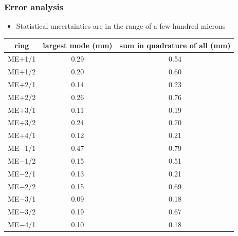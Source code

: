 \documentclass[compress]{beamer}
\begin{document}
\begin{frame}
\frametitle{Error analysis}

\begin{itemize}
\item Statistical uncertainties are in the range of a few hundred microns
\end{itemize}

\renewcommand{\arraystretch}{1.1}

\begin{center}\begin{tabular}{c c c}
\hline\hline
ring & largest mode (mm) & sum in quadrature of all (mm) \\\hline
ME$+$1/1 & 0.29 & 0.54 \\
ME$+$1/2 & 0.20 & 0.60 \\
ME$+$2/1 & 0.14 & 0.23 \\
ME$+$2/2 & 0.26 & 0.76 \\
ME$+$3/1 & 0.11 & 0.19 \\
ME$+$3/2 & 0.24 & 0.70 \\
ME$+$4/1 & 0.12 & 0.21 \\\hline
ME$-$1/1 & 0.47 & 0.79 \\
ME$-$1/2 & 0.15 & 0.51 \\
ME$-$2/1 & 0.13 & 0.21 \\
ME$-$2/2 & 0.15 & 0.69 \\
ME$-$3/1 & 0.09 & 0.18 \\
ME$-$3/2 & 0.19 & 0.67 \\
ME$-$4/1 & 0.10 & 0.18 \\\hline\hline
\end{tabular}\end{center}
\end{frame}
\end{document}
